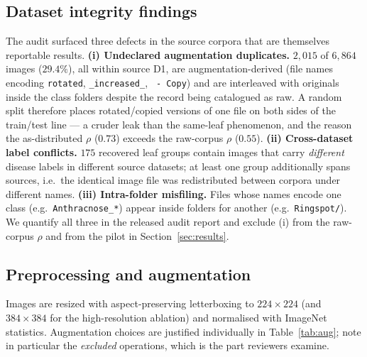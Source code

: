 \documentclass[10pt,twocolumn,a4paper]{article}
\begin{document}
\subsection{Dataset integrity findings}
\label{sec:integrity}
The audit surfaced three defects in the source corpora that are themselves reportable results.
\textbf{(i) Undeclared augmentation duplicates.} $2{,}015$ of $6{,}864$ images ($29.4\%$), all within source D1, are augmentation-derived (file names encoding \texttt{rotated}, \texttt{\_increased\_}, \texttt{ - Copy}) and are interleaved with originals inside the class folders despite the record being catalogued as raw. A random split therefore places rotated/copied versions of one file on both sides of the train/test line --- a cruder leak than the same-leaf phenomenon, and the reason the as-distributed $\rho$ ($0.73$) exceeds the raw-corpus $\rho$ ($0.55$).
\textbf{(ii) Cross-dataset label conflicts.} $175$ recovered leaf groups contain images that carry \emph{different} disease labels in different source datasets; at least one group additionally spans sources, i.e.\ the identical image file was redistributed between corpora under different names.
\textbf{(iii) Intra-folder misfiling.} Files whose names encode one class (e.g.\ \texttt{Anthracnose\_*}) appear inside folders for another (e.g.\ \texttt{Ringspot/}). We quantify all three in the released audit report and exclude (i) from the raw-corpus $\rho$ and from the pilot in Section~\ref{sec:results}.

\subsection{Preprocessing and augmentation}
Images are resized with aspect-preserving letterboxing to $224\times224$ (and $384\times384$ for the high-resolution ablation) and normalised with ImageNet statistics. Augmentation choices are justified individually in Table~\ref{tab:aug}; note in particular the \emph{excluded} operations, which is the part reviewers examine.
\end{document}
